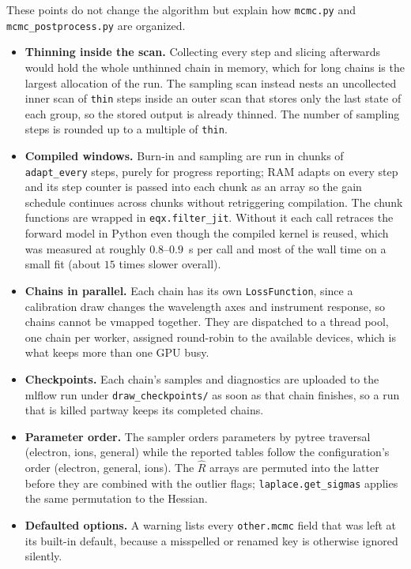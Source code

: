 \documentclass[11pt]{article}
\newcommand{\code}[1]{\texttt{#1}}
\newcommand{\file}[1]{\texttt{#1}}
\begin{document}
These points do not change the algorithm but explain how \file{mcmc.py} and
\file{mcmc\_postprocess.py} are organized.
\begin{itemize}
  \item \textbf{Thinning inside the scan.} Collecting every step and slicing afterwards
    would hold the whole unthinned chain in memory, which for long chains is the largest
    allocation of the run. The sampling scan instead nests an uncollected inner scan of
    \code{thin} steps inside an outer scan that stores only the last state of each group,
    so the stored output is already thinned. The number of sampling steps is rounded up to
    a multiple of \code{thin}.
  \item \textbf{Compiled windows.} Burn-in and sampling are run in chunks of
    \code{adapt\_every} steps, purely for progress reporting; RAM adapts on every step and
    its step counter is passed into each chunk as an array so the gain schedule continues
    across chunks without retriggering compilation. The chunk functions are wrapped in
    \code{eqx.filter\_jit}. Without it each call retraces the forward model in Python even
    though the compiled kernel is reused, which was measured at roughly $0.8$--$0.9$~s per
    call and most of the wall time on a small fit (about $15$ times slower overall).
  \item \textbf{Chains in parallel.} Each chain has its own \code{LossFunction}, since a
    calibration draw changes the wavelength axes and instrument response, so chains
    cannot be vmapped together. They are dispatched to a thread pool, one chain per
    worker, assigned round-robin to the available devices, which is what keeps more than
    one GPU busy.
  \item \textbf{Checkpoints.} Each chain's samples and diagnostics are uploaded to the
    mlflow run under \code{draw\_checkpoints/} as soon as that chain finishes, so a run that
    is killed partway keeps its completed chains.
  \item \textbf{Parameter order.} The sampler orders parameters by pytree traversal
    (electron, ions, general) while the reported tables follow the configuration's order
    (electron, general, ions). The $\hat R$ arrays are permuted into the latter before they
    are combined with the outlier flags; \code{laplace.get\_sigmas} applies the same
    permutation to the Hessian.
  \item \textbf{Defaulted options.} A warning lists every \code{other.mcmc} field that was
    left at its built-in default, because a misspelled or renamed key is otherwise ignored
    silently.
\end{itemize}
\end{document}
